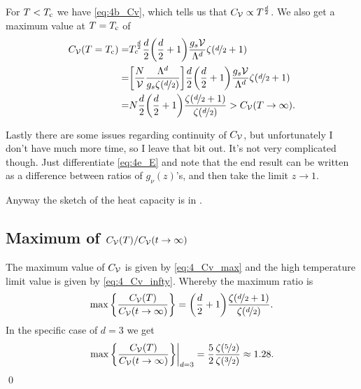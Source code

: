 \documentclass[11pt,letter, swedish, english
]{article}
\begin{document}
For $T<T_{\text{c}}$ we have \eqref{eq:4b_Cv}, which tells us that 
$C_{\mathcal{V}}\propto T^{\frac{d}{2}}$. We also get a maximum value at $T=T_{\text{c}}$ of
\begin{equation}
\begin{aligned}\label{eq:4_Cv_max}
C_{\mathcal{V}}(T=T_{\text{c}})=&
T_c^{\frac{d}{2}}\frac{d}{2}\qty(\frac{d}{2}+1)\frac{g_s\mathcal{V}}{\Lambda^d}\zeta(\nicefrac{d}{2}+1)\\
=&\qty[\frac{N}{\mathcal{V}}\frac{\Lambda^d}{g_s\zeta(\nicefrac{d}{2})}]
\frac{d}{2}\qty(\frac{d}{2}+1)\frac{g_s\mathcal{V}}{\Lambda^d}\zeta(\nicefrac{d}{2}+1)\\
=&N\frac{d}{2}\qty(\frac{d}{2}+1)
\frac{\zeta(\nicefrac{d}{2}+1)}{\zeta(\nicefrac{d}{2})}>C_{\mathcal{V}}(T\to\infty).
\\
\end{aligned}
\end{equation}

Lastly there are some issues regarding continuity of $C_{\mathcal{V}}$, but
unfortunately I don't have much more time, so I leave that bit
out. It's not very complicated though. Just differentiate
\eqref{eq:4e_E} and note that the end result can be written as a
difference between ratios of $g_\nu(z)$'s, and then take the limit
$z\to1$. 

Anyway the sketch of the heat capacity is in .

\subsection{Maximum of $C_{\mathcal{V}}(T)/C_{\mathcal{V}}(t\to\infty)$}
The maximum value of $C_{\mathcal{V}}$ is given by \eqref{eq:4_Cv_max} and the
high temperature limit value is given by
\eqref{eq:4_Cv_infty}. Whereby the maximum ratio is
\begin{equation}
\max\qty{\frac{C_{\ensuremath{\mathcal{V}}}(T)}{C_{\ensuremath{\mathcal{V}}}(t\to\infty)}}=
\qty(\frac{d}{2}+1)\frac{\zeta(\nicefrac{d}{2}+1)}{\zeta(\nicefrac{d}{2})}.
\end{equation}
In the specific case of $d=3$ we get 
\begin{equation}
\eval{\max\qty{\frac{C_\V(T)}{C_\V(t\to\infty)}}}_{d=3}=
\frac{5}{2}\frac{\zeta(\nicefrac{5}{2})}{\zeta(\nicefrac{3}{2})}
\approx 1.28.
\end{equation}
\qed
\end{document}
